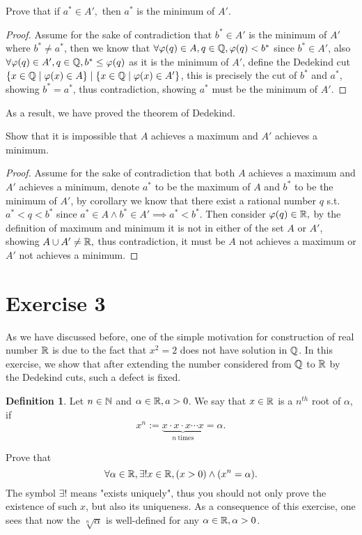 \documentclass{homework}
\newcommand{\R}{\bb{R}} %
\newcommand{\Q}{\bb{Q}} %
\newcommand{\N}{\bb{N}} %
\newcommand{\?}{\stackrel{?}{=}}
\theoremstyle{definition}
\newtheorem*{definition}{Definition}
\begin{document}
\question[3] Prove that if $a^*\in A',$ then $a^*$ is the minimum of $A'$.
\begin{proof}
    Assume for the sake of contradiction that $b^*\in A'$ is the minimum of $A'$ where $b^*\neq a^*$, then we know that $\forall \varphi(q)\in A, q\in\Q, \varphi(q) < b^*$ since  $b^*\in A'$, also  $\forall\varphi(q)\in A', q\in\Q, b^*\leq\varphi(q)$ as it is the minimum of $A'$, define the Dedekind cut $\{x\in\Q\mid \varphi(x)\in A\}\mid\{x\in\Q\mid \varphi(x)\in A'\}$, this is precisely the cut of $b^*$ and $a^*$, showing $b^*=a^*$, thus contradiction, showing $a^*$ must be the minimum of $A'$. 
\end{proof}

As a result, we have proved the theorem of Dedekind.

\question[4] Show that it is impossible that $A$ achieves a maximum and $A'$ achieves a minimum. 
\begin{proof}
    Assume for the sake of contradiction that both $A$ achieves a maximum and $A'$ achieves a minimum, denote $a^*$ to be the maximum of $A$ and $b^*$ to be the minimum of $A'$, by corollary we know that there exist a rational number $q$ s.t. $a^*<q<b^*$ since $a^*\in A\land b^*\in A'\implies a^*<b^*$. Then consider $\varphi(q)\in\R,$ by the definition of maximum and minimum it is not in either of the set $A$ or $A'$, showing $A\cup A'\neq\R,$ thus contradiction, it must be $A$ not achieves a maximum or $A'$ not achieves a minimum.
\end{proof}


\newpage
\section*{Exercise 3}

As we have discussed before, one of the simple motivation for construction of real number $\R$ is due to the fact that $x^2=2$ does not have solution in $\Q$. In this exercise, we show that after extending the number considered from $\Q$ to $\R$ by the Dedekind cuts, such a defect is fixed.

\begin{definition}
    Let $n\in\N$ and $\alpha\in\R, a>0$. We say that $x\in\R$ is a $n^{th}$ root of $\alpha$, if $$x^n :=\underbrace{x\cdot x\cdot x \cdots x}_{n\mathrm{~times}} =\alpha.$$
\end{definition}
Prove that $$\forall \alpha\in\R, \exists !x\in\R, (x>0)\land(x^n=\alpha).$$
The symbol $\exists !$ means "exists uniquely", thus you should not only prove the existence of such $x$, but also its uniqueness. As a consequence of this exercise, one sees that now the $\sqrt[n]{\alpha}$ is well-defined for any $\alpha\in\R,\alpha>0$. 
\end{document}
